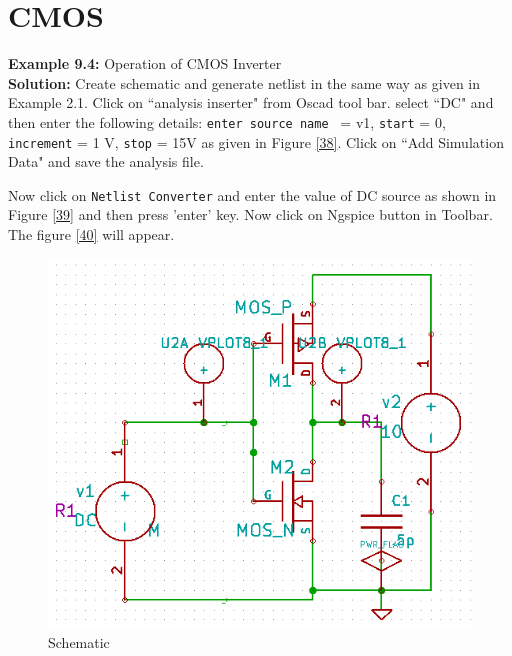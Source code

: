 \section {CMOS}

\textbf{Example 9.4:} Operation of CMOS Inverter\\


\textbf {Solution:} Create schematic and generate netlist in the same way as given in Example 2.1.
Click on ``analysis inserter" from Oscad tool bar.
select ``DC" and then enter the following details:
{\tt enter source name } = v1, {\tt start} = 0, {\tt increment} = 1 V, {\tt stop} = 15V as given in Figure \ref{38}. Click on ``Add Simulation Data" and save the analysis file. 

Now click on {\tt Netlist Converter} and enter the value of DC source as shown in Figure \ref{39} and then press 'enter' key. Now click on Ngspice button in Toolbar. The figure \ref{40} will appear.
\begin{figure}%
\begin{center}
\includegraphics[width=1\linewidth]{figures/apd37.png}%
\caption{Schematic}
\label{37}
\end{center}
\end{figure}
